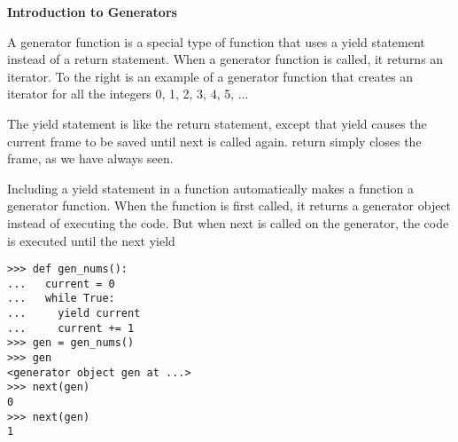 \textbf{Introduction to Generators}

A generator function is a special type of function that uses a yield statement instead of a return statement. When a generator function is called, it returns an iterator.
To the right is an example of a generator function that creates an iterator for all the integers 0, 1, 2, 3, 4, 5, ...

The yield statement is like the return statement, except that yield causes the current frame to be saved until next is called again. return simply closes the frame, as we have always seen.

Including a yield statement in a function automatically makes a function a generator function. When the function is first called, it returns a generator object instead of executing the code. But when next is called on the generator, the code is executed until the next yield

\begin{lstlisting}
>>> def gen_nums():
...   current = 0
...   while True:
...     yield current
...     current += 1
>>> gen = gen_nums()
>>> gen
<generator object gen at ...>
>>> next(gen)
0
>>> next(gen)
1
\end{lstlisting}
